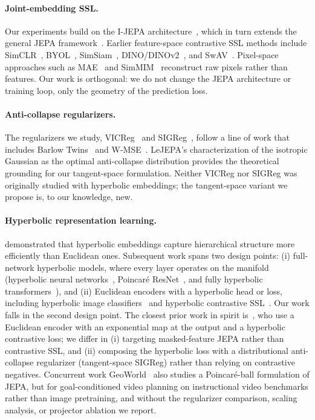 \documentclass{article}
\begin{document}
\paragraph{Joint-embedding SSL.}
Our experiments build on the I-JEPA architecture~\citep{assran2023ijepa}, which in turn extends the general JEPA framework~\citep{lecun2022path}. Earlier feature-space contrastive SSL methods include SimCLR~\citep{chen2020simclr}, BYOL~\citep{grill2020byol}, SimSiam~\citep{chen2021simsiam}, DINO/DINOv2~\citep{caron2021dino,oquab2024dinov2}, and SwAV~\citep{caron2020swav}. Pixel-space approaches such as MAE~\citep{he2022mae} and SimMIM~\citep{xie2022simmim} reconstruct raw pixels rather than features. Our work is orthogonal: we do not change the JEPA architecture or training loop, only the geometry of the prediction loss.

\paragraph{Anti-collapse regularizers.}
The regularizers we study, VICReg~\citep{bardes2022vicreg} and SIGReg~\citep{ball2025lejepa}, follow a line of work that includes Barlow Twins~\citep{zbontar2021barlowtwins} and W-MSE~\citep{ermolov2021whitening}. LeJEPA's characterization of the isotropic Gaussian as the optimal anti-collapse distribution provides the theoretical grounding for our tangent-space formulation. Neither VICReg nor SIGReg was originally studied with hyperbolic embeddings; the tangent-space variant we propose is, to our knowledge, new.

\paragraph{Hyperbolic representation learning.}
\citet{nickel2017poincare} demonstrated that hyperbolic embeddings capture hierarchical structure more efficiently than Euclidean ones. Subsequent work spans two design points: (i) full-network hyperbolic models, where every layer operates on the manifold (hyperbolic neural networks~\citep{ganea2018hyperbolic,shimizu2021hyperbolicnn}, Poincar\'{e} ResNet~\citep{vanspengler2023poincareresnet}, and fully hyperbolic transformers~\citep{chen2022hyperbolic}), and (ii) Euclidean encoders with a hyperbolic head or loss, including hyperbolic image classifiers~\citep{khrulkov2020hyperbolic} and hyperbolic contrastive SSL~\citep{yue2023hyperbolic,ge2023hyperbolic}. Our work falls in the second design point. The closest prior work in spirit is~\citet{yue2023hyperbolic}, who use a Euclidean encoder with an exponential map at the output and a hyperbolic contrastive loss; we differ in (i) targeting masked-feature JEPA rather than contrastive SSL, and (ii) composing the hyperbolic loss with a distributional anti-collapse regularizer (tangent-space SIGReg) rather than relying on contrastive negatives. Concurrent work GeoWorld~\citep{zhang2026geoworld} also studies a Poincar\'{e}-ball formulation of JEPA, but for goal-conditioned video planning on instructional video benchmarks rather than image pretraining, and without the regularizer comparison, scaling analysis, or projector ablation we report.
\end{document}
